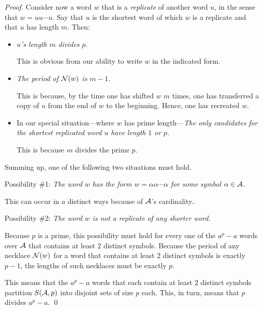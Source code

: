 \begin{proof}
Consider now a word $w$ that is a {\it replicate}
 of another word $u$, in the sense that $w = uu
\cdots u$.  Say that $u$ is the shortest word of which $w$ is a
replicate and that $u$ has length $m$.  Then:
\begin{itemize}
\item
{\em $u$'s length $m$ divides $p$.}

This is obvious from our ability to write $w$ in the indicated form.

\item
{\em The period of $\mbox{$\cal N$}(w)$ is $m-1$.}

This is because, by the time one has shifted $w$ $m$ times, one has
transferred a copy of $u$ from the end of $w$ to the beginning.
Hence, one has recreated $w$.

\item
In our special situation---where $w$ has prime length---{\em The only
  candidates for the shortest replicated word $u$ have length $1$ or
  $p$.}

This is because $m$ divides the prime $p$.
\end{itemize}
Summing up, one of the following two situations must hold.

\noindent
Possibility \#1:
{\em The word $w$ has the form $w = \alpha \alpha \cdots \alpha$ for
  some symbol $\alpha \in \mbox{$\cal A$}$.}

This can occur in $a$ distinct ways because of $\mbox{$\cal A$}$'s cardinality..

\noindent
Possibility \#2:
{\em The word $w$ is not a replicate of any shorter word.}

Because $p$ is a prime, this possibility must hold for every one of
the $a^p - a$ words over $\mbox{$\cal A$}$ that contains at least $2$ distinct
symbols.  Because the period of any necklace $\mbox{$\cal N$}(w)$ for a word that
contains at least $2$ distinct symbols is exactly $p-1$, the lengths
of such necklaces must be exactly $p$.

This means that the $a^p - a$ words that each contain at least $2$
distinct symbols partition $S(\mbox{$\cal A$}, p)$ into disjoint sets of size $p$
each.  This, in turn, means that $p$ divides $a^p - a$.
\qed
\end{proof}

